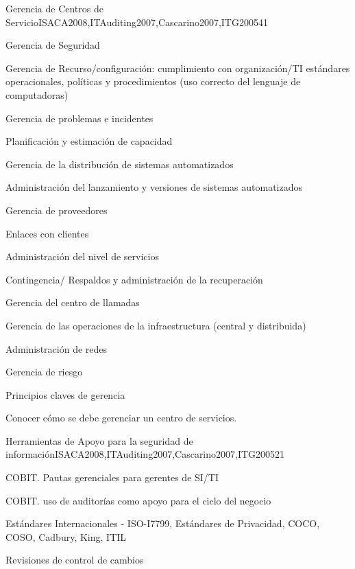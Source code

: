\begin{syllabus}
    \begin{unit}{Gerencia de Centros de Servicio}{}{ISACA2008,ITAuditing2007,Cascarino2007,ITG2005}{4}{1}
    \begin{topics}
    \item Gerencia de Seguridad
    \item Gerencia de Recurso/configuración: cumplimiento con organización/TI estándares operacionales, políticas y procedimientos (uso correcto del lenguaje de computadoras)
    \item Gerencia de problemas e incidentes 
    \item Planificación y estimación de capacidad
    \item Gerencia de la distribución de sistemas automatizados
    \item Administración del lanzamiento y versiones de sistemas automatizados
    \item Gerencia de proveedores
    \item Enlaces con clientes
    \item Administración del nivel de servicios
    \item Contingencia/ Respaldos y administración de la recuperación
    \item Gerencia del centro de llamadas
    \item Gerencia de las operaciones de la infraestructura (central y distribuida)
    \item Administración de redes
    \item Gerencia de riesgo
    \item Principios claves de gerencia
    \end{topics}
    \begin{learningoutcomes}
    \item Conocer cómo se debe gerenciar un centro de servicios.
    \end{learningoutcomes}
    \end{unit}
    
    \begin{unit}{Herramientas de Apoyo para la seguridad de información}{}{ISACA2008,ITAuditing2007,Cascarino2007,ITG2005}{2}{1}
    \begin{topics}
    \item COBIT. Pautas gerenciales para gerentes de SI/TI
    \item COBIT. uso de auditorías como apoyo para el ciclo del negocio
    \item Estándares Internacionales - ISO-I7799, Estándares de Privacidad, COCO, COSO, Cadbury, King, ITIL
    \item Revisiones de control de cambios
    \end{topics}
    

\end{unit}
\end{syllabus}
